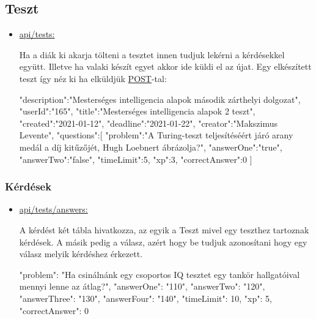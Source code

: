 \subsection{Teszt}
\begin{itemize}[label={$\bullet$}, topsep=0pt, itemsep=0pt, leftmargin=15pt]
    \item[] {\url{api/tests:}}
          \begin{addmargin}[\parindent]{0pt}
              Ha a diák ki akarja tölteni a tesztet innen tudjuk lekérni a kérdésekkel együtt. Illetve ha valaki készít egyet akkor ide küldi el az újat.
              Egy elkészített teszt így néz ki ha elküldjük \url{POST}-tal:
              \begin{json}
{
    "description":"Mesterséges intelligencia alapok második zárthelyi dolgozat",
    "userId":"165",
    "title":"Mesterséges intelligencia alapok 2 teszt",
    "created":"2021-01-12",
    "deadline":"2021-01-22",
    "creator":"Makszimus Levente",
    "questions":[
        {
            "problem":"A Turing-teszt teljesítéséért járó arany medál a díj kitűzőjét, Hugh Loebnert ábrázolja?",
            "answerOne":"true",
            "answerTwo":"false",
            "timeLimit":5,
            "xp":3,
            "correctAnswer":0
        }
    ]
}
              \end{json}
          \end{addmargin}
\end{itemize}

\subsubsection{Kérdések}
\begin{itemize}[label={$\bullet$}, topsep=0pt, itemsep=0pt, leftmargin=15pt]
    \item[] {\url{api/tests/answers:}}
          \begin{addmargin}[\parindent]{0pt}
              A kérdést két tábla hivatkozza, az egyik a Teszt mivel egy teszthez tartoznak kérdések. A másik pedig a válasz, azért hogy be tudjuk azonosítani hogy egy válasz melyik kérdéshez érkezett.
              \begin{json}
{
    "problem": "Ha csinálnánk egy csoportos IQ tesztet egy tankör hallgatóival mennyi lenne az átlag?",
    "answerOne": "110",
    "answerTwo": "120",
    "answerThree": "130",
    "answerFour": "140",
    "timeLimit": 10,
    "xp": 5,
    "correctAnswer": 0
}
              \end{json}
          \end{addmargin}
\end{itemize}

